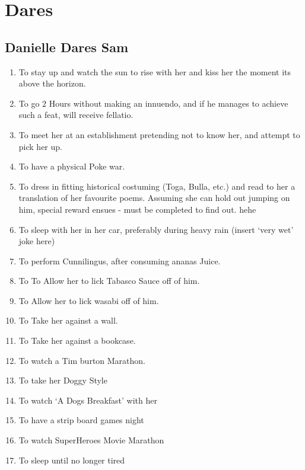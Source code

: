 
 

 \section{Dares}

 \renewcommand{\theenumi}{\thesubsection.\arabic{enumi}}

   \subsection{Danielle Dares Sam}

\begin{enumerate}
\item  To stay up and watch the sun to rise with her and kiss her the moment its above the horizon.

\item  To go $2$ Hours without making an innuendo, and if he manages to achieve such a feat, will receive fellatio.

\item  To meet her at an establishment pretending not to know her, and attempt to pick her up.

\item  To have a physical Poke war. 

\item  To dress in fitting historical costuming (Toga, Bulla, etc.) and read to her a translation of her favourite poems.  Assuming she can hold out  jumping on him, special reward ensues - must be completed to find out.  hehe 

\item  To sleep with her in her car, preferably during heavy rain (insert `very wet' joke here) 

\item To perform Cunnilingus, after consuming ananas Juice.

\item To To Allow her to lick Tabasco Sauce off of him.

\item To Allow her to lick wasabi off of him.

\item To Take her against a wall.

\item To Take her against a bookcase.

\item To watch a Tim burton Marathon.

\item To take her Doggy Style

\item To watch `A Dogs Breakfast' with her

\item To have a strip board games night

\item To watch SuperHeroes Movie Marathon

\item To sleep until no longer tired

\end{enumerate}


